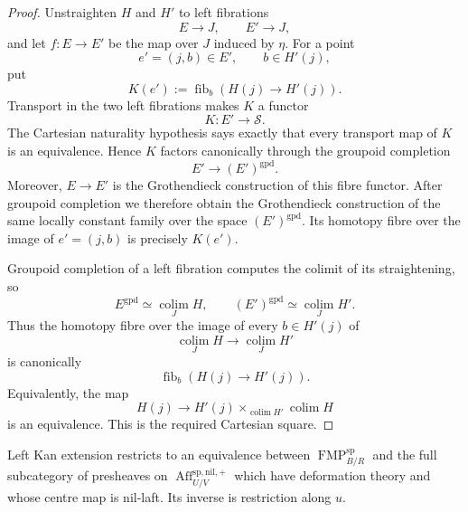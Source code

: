 \begin{proof}
Unstraighten $H$ and $H'$ to left fibrations
\[
    E\longrightarrow J,
    \qquad
    E'\longrightarrow J,
\]
and let $f:E\to E'$ be the map over $J$ induced by $\eta$.  For a point
\[
    e'=(j,b)\in E',
    \qquad b\in H'(j),
\]
put
\[
    K(e')
    :=
    \operatorname{fib}_b(H(j)\to H'(j)).
\]
Transport in the two left fibrations makes $K$ a functor
\[
    K:E'\longrightarrow\mathcal S.
\]
The Cartesian naturality hypothesis says exactly that every transport map of
$K$ is an equivalence.  Hence $K$ factors canonically through the groupoid
completion
\[
    E'\longrightarrow(E')^{\mathrm{gpd}}.
\]
Moreover, $E\to E'$ is the Grothendieck construction of this fibre functor.
After groupoid completion we therefore obtain the Grothendieck construction of
the same locally constant family over the space $(E')^{\mathrm{gpd}}$.  Its
homotopy fibre over the image of $e'=(j,b)$ is precisely $K(e')$.

Groupoid completion of a left fibration computes the colimit of its
straightening, so
\[
    E^{\mathrm{gpd}}
    \simeq
    \operatorname*{colim}_{J}H,
    \qquad
    (E')^{\mathrm{gpd}}
    \simeq
    \operatorname*{colim}_{J}H'.
\]
Thus the homotopy fibre over the image of every $b\in H'(j)$ of
\[
    \operatorname*{colim}_{J}H
    \longrightarrow
    \operatorname*{colim}_{J}H'
\]
is canonically
\[
    \operatorname{fib}_b(H(j)\to H'(j)).
\]
Equivalently, the map
\[
    H(j)
    \longrightarrow
    H'(j)\times_{\operatorname*{colim}H'}\operatorname*{colim}H
\]
is an equivalence.  This is the required Cartesian square.
\end{proof}

\begin{theorem}
\label{thm:bnli-first-stage-recognition}
Left Kan extension restricts to an equivalence between
$\operatorname{FMP}^{\mathrm{sp}}_{B/R}$ and the full subcategory of
presheaves on $\operatorname{Aff}^{\mathrm{sp,nil,+}}_{U/V}$ which have
deformation theory and whose centre map is nil-laft.  Its inverse is
restriction along $u$.
\end{theorem}

